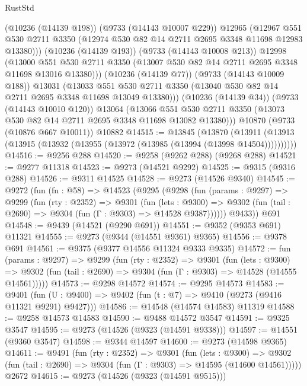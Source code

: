 \begin{lexlean}{RustStd}
\begin{coremodule}
{\begin{coremodule}
{{{{{{{{{{{{{{{{{{{{{{{{{{{{{{{{{{{{{{{{{{{{{{{{{{{{{{{            (@10236 (@14139 @198))
            (@9733 (@14143 @10007 @229))
            @12965
            (@12967
              @551
              @530
              @2711
              @3350
              (@12974 @530 @82 @14 @2711 @2695 @3348 @11698 @12983 @13380)))
          (@10236 (@14139 @193))
          (@9733 (@14143 @10008 @213))
          @12998
          (@13000
            @551
            @530
            @2711
            @3350
            (@13007 @530 @82 @14 @2711 @2695 @3348 @11698 @13016 @13380)))
        (@10236 (@14139 @77))
        (@9733 (@14143 @10009 @188))
        @13031
        (@13033 @551 @530 @2711 @3350 (@13040 @530 @82 @14 @2711 @2695 @3348 @11698 @13049 @13380)))
      (@10236 (@14139 @34))
      (@9733 (@14143 @10010 @120))
      @13064
      (@13066 @551 @530 @2711 @3350 (@13073 @530 @82 @14 @2711 @2695 @3348 @11698 @13082 @13380)))
    @10870
    (@9733 (@10876 @667 @10011))
    @10882
@14515 := @13845
    (@13870 (@13911 (@13913 (@13915 (@13932 (@13955 (@13972 (@13985 (@13994 (@13998 @14504))))))))))
@14516 := @9256 @288
@14520 := @9258 (@9262 @288) (@9268 @288)
@14521 := @9277 @11318
@14523 := @9273 (@14521 @9292)
@14525 := @9315 (@9316 @288)
@14526 := @9311 @14525
@14528 := @9273 (@14526 @9340)
@14545 := @9272
    (fun (fn : @58) =>
    @14523
      (@9295
        (@9298
          (fun (params : @9297) =>
          @9299
            (fun (rty : @2352) =>
            @9301
              (fun (lets : @9300) =>
              @9302 (fun (tail : @2690) => @9304 (fun (Γ : @9303) => @14528 @9387))))))
        @9433))
    @691
@14548 := @9439 (@14521 (@9290 @691))
@14551 := @9352 (@9353 @691) @11321
@14555 := @9273 (@9344 (@14551 @9361) @9365)
@14556 := @9378 @691
@14561 := @9375 (@9377 @14556 @11324 @9333 @9335)
@14572 := fun (params : @9297) =>
  @9299
    (fun (rty : @2352) =>
    @9301
      (fun (lets : @9300) =>
      @9302 (fun (tail : @2690) => @9304 (fun (Γ : @9303) => @14528 (@14555 @14561)))))
@14573 := @9298 @14572
@14574 := @9295 @14573
@14583 := @9401
    (fun (U : @9400) => @9402 (fun (t : @7) => @9410 (@9273 (@9416 @11321 @9291) @9427)))
@14586 := @14548 (@14574 @14583) @11319
@14588 := @9258 @14573 @14583
@14590 := @9488 @14572 @3547
@14591 := @9325 @3547
@14595 := @9273 (@14526 (@9323 (@14591 @9338)))
@14597 := @14551 (@9360 @3547)
@14598 := @9344 @14597
@14600 := @9273 (@14598 @9365)
@14611 := @9491
    (fun (rty : @2352) =>
    @9301
      (fun (lets : @9300) =>
      @9302 (fun (tail : @2690) => @9304 (fun (Γ : @9303) => @14595 (@14600 @14561)))))
    @2672
@14615 := @9273 (@14526 (@9323 (@14591 @9515)))
}}}}}}}}}}}}}}}}}}}}}}}}}}}}}}}}}}}}}}}}}}}}}}}}}}}}}}}
\end{coremodule}}
\end{coremodule}
\end{lexlean}
